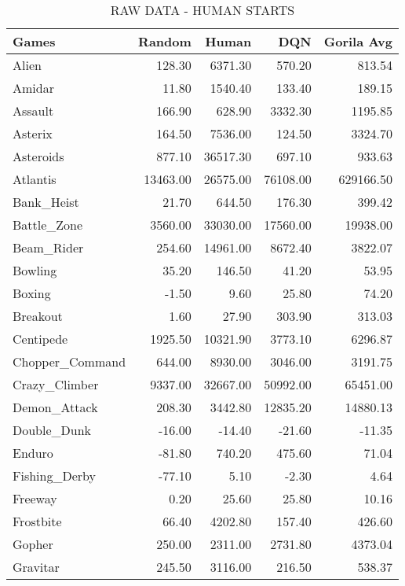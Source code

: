 \begin{table*}[h]
	\vskip 0.5in
	\caption{RAW DATA - HUMAN STARTS}
	\centering 
	\begin{tabular}{l|r|r|r|r}
		\hline \hline
		Games & Random & Human  & DQN & Gorila Avg \\
		\hline
		Alien & 128.30 & 6371.30 & 570.20 & 813.54 \\
		\hline
		Amidar & 11.80 & 1540.40 & 133.40 & 189.15 \\
		\hline
		Assault & 166.90 & 628.90 & 3332.30 & 1195.85 \\
		\hline
		Asterix & 164.50 & 7536.00 & 124.50 & 3324.70 \\
		\hline
		Asteroids & 877.10 & 36517.30 & 697.10 & 933.63 \\
		\hline
		Atlantis & 13463.00 & 26575.00 & 76108.00 & 629166.50 \\
		\hline
		Bank\_Heist & 21.70 & 644.50 & 176.30 & 399.42 \\
		\hline
		Battle\_Zone & 3560.00 & 33030.00 & 17560.00 & 19938.00\\
		\hline
		Beam\_Rider & 254.60 & 14961.00 & 8672.40 & 3822.07 \\
		\hline
		Bowling & 35.20 & 146.50 & 41.20 & 53.95 \\
		\hline
		Boxing & -1.50 & 9.60 & 25.80 & 74.20 \\
		\hline
		Breakout & 1.60 & 27.90 & 303.90 & 313.03 \\
		\hline
		Centipede & 1925.50 & 10321.90 & 3773.10 & 6296.87 \\
		\hline
		Chopper\_Command & 644.00 & 8930.00 & 3046.00 & 3191.75 \\
		\hline
		Crazy\_Climber & 9337.00 & 32667.00 & 50992.00 & 65451.00 \\
		\hline
		Demon\_Attack & 208.30 & 3442.80 & 12835.20 & 14880.13 \\
		\hline
		Double\_Dunk & -16.00 & -14.40 & -21.60 & -11.35 \\
		\hline
		Enduro & -81.80 & 740.20 & 475.60 & 71.04 \\
		\hline
		Fishing\_Derby & -77.10 & 5.10 & -2.30 & 4.64 \\
		\hline
		Freeway & 0.20 & 25.60 & 25.80 & 10.16 \\
		\hline
		Frostbite & 66.40 & 4202.80 & 157.40 & 426.60 \\
		\hline
		Gopher & 250.00 & 2311.00 & 2731.80 & 4373.04 \\
		\hline
		Gravitar & 245.50 & 3116.00 & 216.50 & 538.37 \\

\end{tabular}
\end{table*}
